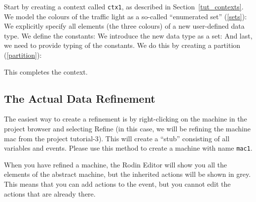 Start by creating a context called \texttt{ctx1}, as described in Section~\ref{tut_contexts}.
We model the colours of the traffic light as a so-called ``enumerated set'' (\ref{sets}): 
We explicitly specify all elements (the three colours) of a new user-defined data type.
We define the constants:
We introduce the new data type as a set:
And last, we need to provide typing of the constants.  We do this by creating a partition (\ref{partition}):


This completes the context.

\subsection{The Actual Data Refinement}
\label{tut_actual_data_refinement}

The easiest way to create a refinement is by right-clicking on the machine in the project browser and selecting \textsf{Refine} (in this case, we will be refining the machine \textsf{mac} from the project \textsf{tutorial-3}).  This will create a ``stub'' consisting of all variables and events. Please use this method to create a machine with name \texttt{mac1}.

When you have refined a machine, the Rodin Editor will show you all the elements of the abstract machine, but the inherited actions will be shown in grey. This means that you can add actions to the event, but you cannot edit the actions that are already there.

